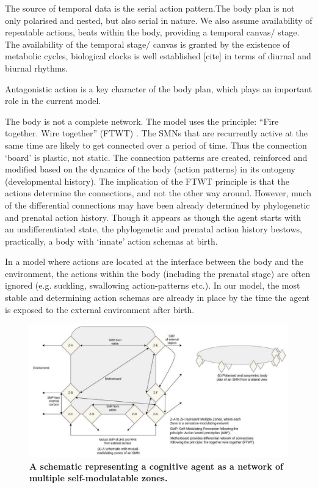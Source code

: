 The source of temporal data is the serial action pattern.The body plan is not only polarised and nested, but also serial in nature. We also assume availability of repeatable actions, beats within the body, providing a temporal canvas/ stage. The availability of the temporal stage/ canvas is granted by the existence of metabolic cycles, biological clocks is well established [cite] in terms of diurnal and biurnal rhythms.

Antagonistic action is a key character of the body plan, which plays an important role in the current model. 

The body is not a complete network. The model uses the principle: ``Fire together. Wire together'' (FTWT) \cite{hebb1949organisation}. The SMNs that are recurrently active at the same time are likely to get connected over a period of time. Thus the connection `board' is plastic, not static. The connection patterns are created, reinforced and modified based on the dynamics of the body (action patterns) in its ontogeny (developmental history). The implication of the FTWT principle is that the actions determine the connections, and not the other way around. However, much of the differential connections may have been already determined by phylogenetic and prenatal action history. Though it appears as though the agent starts with an undifferentiated state, the phylogenetic and prenatal action history bestows, practically, a body with `innate' action schemas at birth.

In a model where actions are located at the interface between the body and the environment, the actions within the body (including the prenatal stage) are often ignored (e.g. suckling, swallowing action-patterns etc.). In our model, the most stable and determining action schemas are already in place by the time the agent is exposed to the external environment after birth. 

\begin{figure}[ht] 
\includegraphics[width=\textwidth]{graphics/self-modulating-perception.pdf}
\caption{\textbf{A schematic representing a cognitive agent as a network of multiple self-modulatable zones.}}
\label{smn}
\end{figure}

